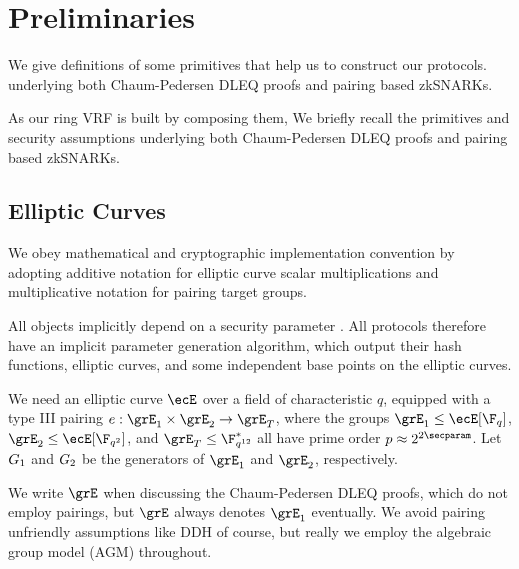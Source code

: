 
\newcommand{\com}{\mathsf{Com}}
\newcommand{\open}{\mathsf{Open}}
\newcommand{\commit}{\mathsf{Commit}}
\newcommand{\NARK}{\mathsf{NARK}}
\section{Preliminaries} %
\label{sec:background}

 We  give definitions of some  primitives that help us to construct our protocols.
 underlying both Chaum-Pedersen DLEQ proofs and pairing based zkSNARKs.

 As our ring VRF is built by composing them,
 We briefly recall the primitives and security assumptions underlying
 both Chaum-Pedersen DLEQ proofs and pairing based zkSNARKs.


\subsection{Elliptic Curves}
\label{sec:ec_background}


We obey mathematical and cryptographic implementation convention by 
adopting additive notation for elliptic curve  scalar multiplications and 
multiplicative notation for pairing target groups.

All objects implicitly depend on a security parameter \secparam.
All protocols therefore have an implicit parameter generation algorithm,
which output their hash functions, elliptic curves, and some independent base points on the elliptic curves.

We need an elliptic curve $\ecE$ over a field of characteristic $q$,
equipped with a type III pairing $e : \grE_1 \times \grE_2 \to \grE_T$,
where the groups  $\grE_1 \le \ecE[\F_q]$, $\grE_2 \le \ecE[\F_{q^2}]$, and
$\grE_T \le \F^*_{q^{12}}$ all have prime order $p \approx 2^{2\secparam}$. 
Let ${G}_1$ and ${G}_2$ be the generators of $\grE_1$ and $\grE_2$, respectively. 

We write $\grE$ when discussing the Chaum-Pedersen DLEQ proofs, which do
not employ pairings, but $\grE$ always denotes $\grE_1$ eventually.
We avoid pairing unfriendly assumptions like DDH of course, but really
we employ the algebraic group model (AGM) throughout.

